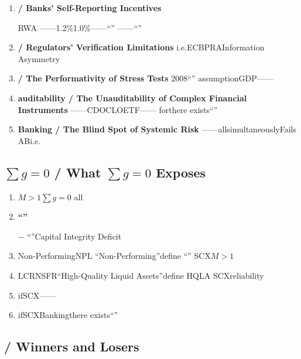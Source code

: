 \documentclass[12pt,a4paper]{article}
\theoremstyle{remark}
\newcommand{\sumgeq}{\sum g = 0}
\begin{document}
\begin{enumerate}[leftmargin=*, label=\textbf{(\arabic*)}]
    \item \textbf{ / Banks' Self-Reporting Incentives}
    
    RWA
    ——1.2\%1.0\%——``''
    ——``''
    

    \item \textbf{ / Regulators' Verification Limitations}
    i.e.ECBPRAInformation Asymmetry
    

    \item \textbf{ / The Performativity of Stress Tests}
    2008``''
    assumptionGDP——

    \item \textbf{auditability / The Unauditability of Complex Financial Instruments}
    ——CDOCLOETF——
    forthere exists``''
    

    \item \textbf{Banking / The Blind Spot of Systemic Risk}
    ——allsimultaneouslyFails
    ABi.e.
\end{enumerate}

\subsection{$\sumgeq$ / What $\sumgeq$ Exposes}

\begin{enumerate}[leftmargin=*, label=\textbf{(\arabic*)}]
    \item \textbf{}
    $M>1$$\sumgeq$
    all

    \item \textbf{``''}
    
     $-$ ``''Capital Integrity Deficit

    \item \textbf{}
    Non-PerformingNPL
    ``Non-Performing''define
    ``''
    SCX$M>1$

    \item \textbf{}
    LCRNSFR``High-Quality Liquid Assets''define
    HQLA
    SCXreliability

    \item \textbf{}
    ifSCX——
    

    \item \textbf{}
    ifSCXBankingthere exists``''
    
\end{enumerate}

\subsection{ / Winners and Losers}
\end{document}
